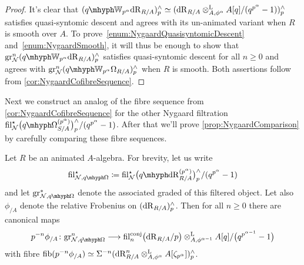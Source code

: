 \documentclass[DIV=12,numbers=enddot,leqno,bibliography=totoc]{scrartcl}
\begin{document}
	\begin{proof}
		It's clear that $(\qIW_{p^\alpha}\deRham_{R/A})_p^\complete\simeq (\deRham_{R/A}\lotimes_{A,\phi^\alpha}A[q]/(q^{p^\alpha}-1))_p^\complete$ satisfies quasi-syntomic descent and agrees with its un-animated variant when $R$ is smooth over $A$. To prove~\cref{enum:NygaardQuasisyntomicDescent} and~\cref{enum:NygaardSmooth}, it will thus be enough to show that $\gr_\Nn^n(\qIW_{p^\alpha}\deRham_{R/A})_p^\complete$ satisfies quasi-syntomic descent for all $n\geqslant 0$ and agrees with $\gr_\Nn^n(\qIW_{p^\alpha}\Omega_{R/A})_p^\complete$ when $R$ is smooth. Both assertions follow from \cref{cor:NygaardCofibreSequence}.
	\end{proof}
	Next we construct an analog of the fibre sequence from \cref{cor:NygaardCofibreSequence} for the other Nygaard filtration $ \fil_\Nn^\star \bigl(\qOmega_{S/A}^{(p^\alpha)}\bigr)_p^\complete/(q^{p^\alpha}-1)$. After that we'll prove \cref{prop:NygaardComparison} by carefully comparing these fibre sequences.
	\begin{lem}\label{lem:NygaardFibreSequence}
		Let $R$ be an animated $A$-algebra. For brevity, let us write
		\begin{equation*}
			\fil_{\Nn,  \qOmega}^\star \coloneqq  \fil_\Nn^\star \bigl(\qdeRham_{R/A}^{(p^\alpha)}\bigr)_p^\complete/(q^{p^\alpha}-1)
		\end{equation*}
		and let $\gr_{\Nn, \qOmega}^*$ denote the associated graded of this filtered object. Let also $\phi_{/A}$ denote the relative Frobenius on $(\mathrm{dR}_{R/A})_p^\wedge$. Then for all $n\geqslant 0$ there are canonical maps
		\begin{equation*}
			p^{-n}\phi_{/A}\colon \gr_{\Nn, \qOmega}^n\longrightarrow  \fil_n^\mathrm{conj}\bigl(\deRham_{R/A}/p\bigr)\lotimes_{A,\phi^{\alpha-1}}A[q]/\bigl(q^{p^{\alpha-1}}-1\bigr)
		\end{equation*}
		with fibre $\operatorname{fib}(p^{-n}\phi_{/A})\simeq \Sigma^{-n}(\mathrm{dR}_{R/A}^n\otimes^{\mathrm{L}}_{A,\phi^\alpha}A[\zeta_{p^\alpha}])_p^\wedge$.
	\end{lem}
\end{document}
